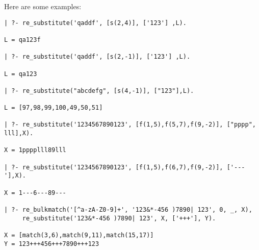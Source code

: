 Here are some examples:
\begin{verbatim}
| ?- re_substitute('qaddf', [s(2,4)], ['123'] ,L).

L = qa123f

| ?- re_substitute('qaddf', [s(2,-1)], ['123'] ,L).

L = qa123

| ?- re_substitute("abcdefg", [s(4,-1)], ["123"],L).

L = [97,98,99,100,49,50,51]

| ?- re_substitute('1234567890123', [f(1,5),f(5,7),f(9,-2)], ["pppp", lll],X).

X = 1pppplll89lll

| ?- re_substitute('1234567890123', [f(1,5),f(6,7),f(9,-2)], ['---'],X).

X = 1---6---89---

| ?- re_bulkmatch('[^a-zA-Z0-9]+', '123&*-456 )7890| 123', 0, _, X),
     re_substitute('123&*-456 )7890| 123', X, ['+++'], Y).

X = [match(3,6),match(9,11),match(15,17)]
Y = 123+++456+++7890+++123
\end{verbatim}

